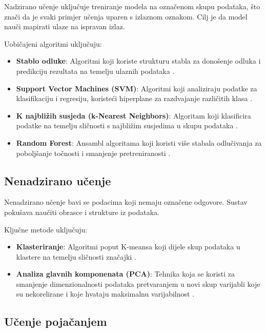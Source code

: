 \documentclass[zavrsnirad]{fer}
\begin{document}
Nadzirano učenje uključuje treniranje modela na označenom skupu podataka, što znači da je svaki primjer učenja uparen s izlaznom oznakom. Cilj je da model nauči mapirati ulaze na ispravan izlaz.

Uobičajeni algoritmi uključuju:

\begin{itemize}
	\item \textbf{Stablo odluke}: Algoritmi koji koriste strukturu stabla za donošenje odluka i predikciju rezultata na temelju ulaznih podataka \cite{somvanshi2016}.
	\item \textbf{Support Vector Machines (SVM)}: Algoritmi koji analiziraju podatke za klasifikaciju i regresiju, koristeći hiperplane za razdvajanje različitih klasa \cite{somvanshi2016}.
	\item \textbf{K najbližih susjeda (k-Nearest Neighbors)}: Algoritam koji klasificira podatke na temelju sličnosti s najbližim susjedima u skupu podataka \cite{mahesh2019}.
	\item \textbf{Random Forest}: Ansambl algoritama koji koristi više stabala odlučivanja za poboljšanje točnosti i smanjenje pretreniranosti \cite{mahesh2019}.
\end{itemize}

\subsection{Nenadzirano učenje}

Nenadzirano učenje bavi se podacima koji nemaju označene odgovore. Sustav pokušava naučiti obrasce i strukture iz podataka.

Ključne metode uključuju:

\begin{itemize}
	\item \textbf{Klasteriranje}: Algoritmi poput K-meansa koji dijele skup podataka u klastere na temelju sličnosti značajki \cite{somvanshi2016}.
	\item \textbf{Analiza glavnih komponenata (PCA)}: Tehnika koja se koristi za smanjenje dimenzionalnosti podataka pretvaranjem u novi skup varijabli koje su nekorelirane i koje hvataju maksimalnu varijabilnost \cite{somvanshi2016}.
\end{itemize}

\subsection{Učenje pojačanjem}
\end{document}

